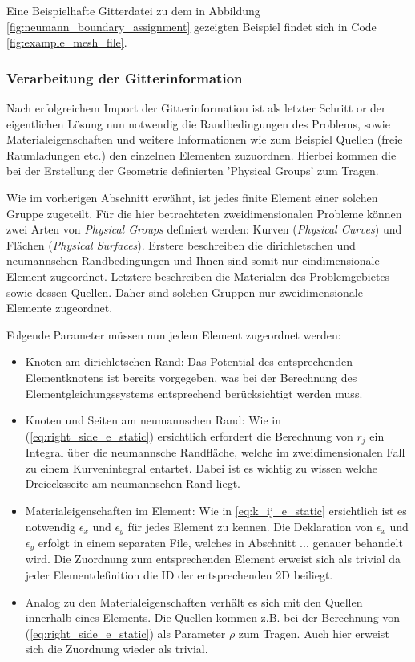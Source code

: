 Eine Beispielhafte Gitterdatei zu dem in Abbildung \ref{fig:neumann_boundary_assignment} gezeigten Beispiel findet sich in Code \ref{fig:example_mesh_file}.


\subsubsection{Verarbeitung der Gitterinformation}
Nach erfolgreichem Import der Gitterinformation ist als letzter Schritt or der eigentlichen Lösung nun notwendig die Randbedingungen des Problems, sowie Materialeigenschaften und weitere Informationen wie zum Beispiel Quellen (freie Raumladungen etc.) den einzelnen Elementen zuzuordnen. Hierbei kommen die bei der Erstellung der Geometrie definierten 'Physical Groups' zum Tragen. \newline

Wie im vorherigen Abschnitt erwähnt, ist jedes finite Element einer solchen Gruppe zugeteilt. Für die hier betrachteten zweidimensionalen Probleme können zwei Arten von \textit{Physical Groups} definiert werden: Kurven (\textit{Physical Curves}) und Flächen (\textit{Physical Surfaces}). Erstere beschreiben die dirichletschen und neumannschen Randbedingungen und Ihnen sind somit nur eindimensionale Element zugeordnet. Letztere beschreiben die Materialen des Problemgebietes sowie dessen Quellen. Daher sind solchen Gruppen nur zweidimensionale Elemente zugeordnet.\newline

Folgende Parameter müssen nun jedem Element zugeordnet werden:
\begin{itemize}
	\item Knoten am dirichletschen Rand: Das Potential des entsprechenden Elementknotens ist bereits vorgegeben, was bei der Berechnung des Elementgleichungssystems entsprechend berücksichtigt werden muss.
	\item Knoten und Seiten am neumannschen Rand: Wie in (\ref{eq:right_side_e_static}) ersichtlich erfordert die Berechnung von $r_j$ ein Integral über die neumannsche Randfläche, welche im zweidimensionalen Fall zu einem Kurvenintegral entartet. Dabei ist es wichtig zu wissen welche Dreiecksseite am neumannschen Rand liegt.
	\item Materialeigenschaften im Element: Wie in \ref{eq:k_ij_e_static} ersichtlich ist es notwendig $\epsilon_x$ und $\epsilon_y$ für jedes Element zu kennen. Die Deklaration von $\epsilon_x$ und $\epsilon_y$ erfolgt in einem separaten File, welches in Abschnitt ... genauer behandelt wird. Die Zuordnung zum entsprechenden Element erweist sich als trivial da jeder Elementdefinition die ID der entsprechenden 2D  beiliegt.
	\item Analog zu den Materialeigenschaften verhält es sich mit den Quellen innerhalb eines Elements. Die Quellen kommen z.B. bei der Berechnung von (\ref{eq:right_side_e_static}) als Parameter $\rho$ zum Tragen. Auch hier erweist sich die Zuordnung wieder als trivial.
\end{itemize}

